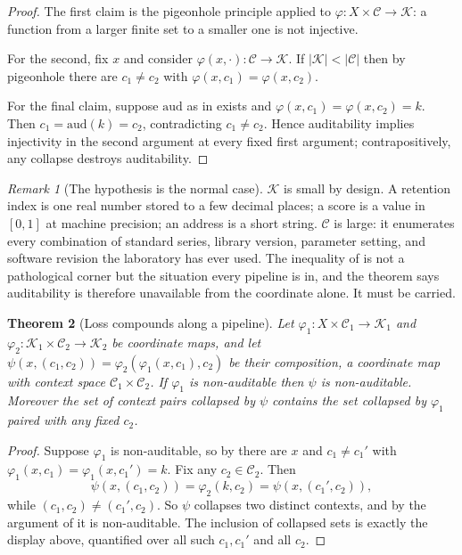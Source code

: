\documentclass[11pt,a4paper]{article}
\newtheorem{theorem}{Theorem}[section]
\theoremstyle{definition}
\theoremstyle{remark}
\newtheorem{remark}[theorem]{Remark}
\newcommand{\Crd}{\mathcal{K}}               %
\newcommand{\Ctx}{\mathcal{C}}               %
\newcommand{\aud}{\mathrm{aud}}
\begin{document}
\begin{proof}
The first claim is the pigeonhole principle applied to
$\varphi : X \times \Ctx \to \Crd$: a function from a larger finite set
to a smaller one is not injective.

For the second, fix $x$ and consider $\varphi(x,\cdot) : \Ctx \to \Crd$.
If $|\Crd| < |\Ctx|$ then by pigeonhole there are $c_1 \neq c_2$ with
$\varphi(x,c_1) = \varphi(x,c_2)$.

For the final claim, suppose $\aud$ as in  exists and
$\varphi(x,c_1) = \varphi(x,c_2) = k$. Then
$c_1 = \aud(k) = c_2$, contradicting $c_1 \neq c_2$. Hence auditability
implies injectivity in the second argument at every fixed first argument;
contrapositively, any collapse destroys auditability.
\end{proof}

\begin{remark}[The hypothesis is the normal case]\label{rem:normal}
$\Crd$ is small by design. A retention index is one real number stored to
a few decimal places; a score is a value in $[0,1]$ at machine precision;
an address is a short string. $\Ctx$ is large: it enumerates every
combination of standard series, library version, parameter setting, and
software revision the laboratory has ever used. The inequality of
 is not a pathological corner but the situation every
pipeline is in, and the theorem says auditability is therefore
unavailable from the coordinate alone. It must be carried.
\end{remark}

\begin{theorem}[Loss compounds along a pipeline]\label{thm:pipeline-loss}
Let $\varphi_1 : X \times \Ctx_1 \to \Crd_1$ and
$\varphi_2 : \Crd_1 \times \Ctx_2 \to \Crd_2$ be coordinate maps, and let
$\psi(x,(c_1,c_2)) = \varphi_2(\varphi_1(x,c_1),c_2)$ be their
composition, a coordinate map with context space
$\Ctx_1 \times \Ctx_2$. If $\varphi_1$ is non-auditable then $\psi$ is
non-auditable. Moreover the set of context pairs collapsed by $\psi$
contains the set collapsed by $\varphi_1$ paired with any fixed $c_2$.
\end{theorem}

\begin{proof}
Suppose $\varphi_1$ is non-auditable, so by  there are
$x$ and $c_1 \neq c_1'$ with $\varphi_1(x,c_1) = \varphi_1(x,c_1') = k$.
Fix any $c_2 \in \Ctx_2$. Then
\[
\psi(x,(c_1,c_2)) = \varphi_2(k,c_2) = \psi(x,(c_1',c_2)),
\]
while $(c_1,c_2) \neq (c_1',c_2)$. So $\psi$ collapses two distinct
contexts, and by the argument of  it is non-auditable.
The inclusion of collapsed sets is exactly the display above, quantified
over all such $c_1,c_1'$ and all $c_2$.
\end{proof}
\end{document}

